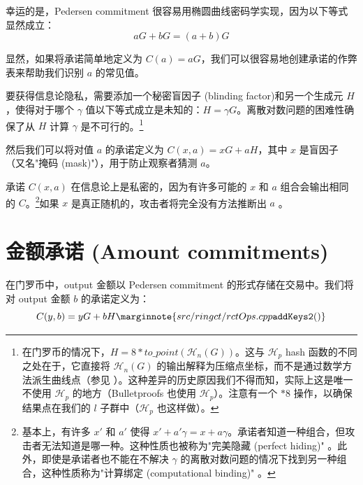 幸运的是，Pedersen commitment 很容易用椭圆曲线密码学实现，因为以下等式显然成立：\[a G + b G = (a + b) G\]

显然，如果将承诺简单地定义为 \(C(a) = a G\)，我们可以很容易地创建承诺的作弊表来帮助我们识别 $a$ 的常见值。

要获得信息论隐私，需要添加一个秘密{盲因子 (blinding factor)}和另一个生成元 \(H\)，使得对于哪个 \(\gamma\) 值以下等式成立是未知的：\(H = \gamma G\)。离散对数问题的困难性确保了从 $H$ 计算 $\gamma$ 是不可行的。\footnote{在门罗币的情况下，$H = 8*to\_point(\mathcal{H}_n(G))$。这与 $\mathcal{H}_p$ hash 函数的不同之处在于，它直接将 $\mathcal{H}_n(G)$ 的输出解释为压缩点坐标，而不是通过数学方法派生曲线点（参见 \cite{hashtopoint-writeup}）。这种差异的历史原因我们不得而知，实际上这是唯一不使用 $\mathcal{H}_p$ 的地方（Bulletproofs 也使用 $\mathcal{H}_p$）。注意有一个 $*8$ 操作，以确保结果点在我们的 $l$ 子群中（$\mathcal{H}_p$ 也这样做）。}


然后我们可以将对值 \(a\) 的承诺定义为 \(C(x, a) = x G + a H\)，其中 \(x\) 是盲因子（又名"掩码 (mask)"），用于防止观察者猜测 $a$。

承诺 $C(x, a)$ 在信息论上是私密的，因为有许多可能的 $x$ 和 $a$ 组合会输出相同的 $C$。\footnote{基本上，有许多 $x'$ 和 $a'$ 使得 $x'+a' \gamma = x+a \gamma$。承诺者知道一种组合，但攻击者无法知道是哪一种。这种性质也被称为"完美隐藏 (perfect hiding)" \cite{adam-zero-to-bulletproofs}。此外，即使是承诺者也不能在不解决 $\gamma$ 的离散对数问题的情况下找到另一种组合，这种性质称为"计算绑定 (computational binding)" \cite{adam-zero-to-bulletproofs}。}如果 $x$ 是真正随机的，攻击者将完全没有方法推断出 $a$ \cite{maxwell-ct, SCOZZAFAVA1993313}。%


\section{金额承诺 (Amount commitments)}
\label{sec:pedersen_monero}

在门罗币中，output 金额以 Pedersen commitment 的形式存储在交易中。我们将对 output 金额 $b$ 的承诺定义为：\vspace{.175cm}
\[C(y,b) = y G + b H\marginnote{src/ringct/ rctOps.cpp {\tt addKeys2()}}\]

